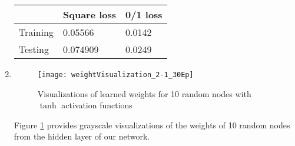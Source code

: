 \documentclass{article}
\begin{document}
\begin{enumerate}
    \begin{tabular}{l|ll}
    & Square loss & 0/1 loss \\
    \hline
    Training &  0.05566 & 0.0142 \\
    Testing  &  0.074909 & 0.0249
    \end{tabular}
    \item 
    \begin{figure}
        \centering
        \texttt{[image: weightVisualization\_2-1\_30Ep]}
        \caption{Visualizations of learned weights for 10 random nodes with $\tanh$ activation functions} 
        \label{fig:weights2-1}
    \end{figure}
    Figure \ref{fig:weights2-1} provides grayscale visualizations of the weights of 10 random nodes from the hidden layer of our network.
\end{enumerate}
\end{document}
